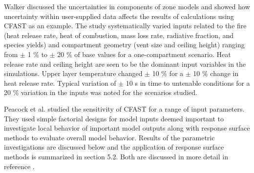 Walker \cite{Walker:1997} discussed the uncertainties in components of zone models and showed how uncertainty within user-supplied data affects the results of calculations using CFAST as an example. The study systematically varied inputs related to the fire (heat release rate, heat of combustion, mass loss rate, radiative fraction, and species yields) and compartment geometry (vent size and ceiling height) ranging from  $\pm$ 1 \% to $\pm$ 20 \% of base values for a one-compartment scenario. Heat release rate and ceiling height are seen to be the dominant input variables in the simulations. Upper layer temperature changed $\pm$ 10 \% for a $\pm$ 10 \% change in heat release rate. Typical variation of $\pm$ 10 s in time to untenable conditions for a 20 \% variation in the inputs was noted for the scenarios studied. 

Peacock et al. \cite{Peacock:1988a} studied the sensitivity of CFAST for a range of input parameters. They used simple factorial designs for model inputs deemed important to investigate local behavior of important model outputs along with response surface methods to evaluate overall model behavior. Results of the parametric investigations are discussed below and the application of response surface methods is summarized in section 5.2. Both are discussed in more detail in reference \cite{Peacock:1988a}.
